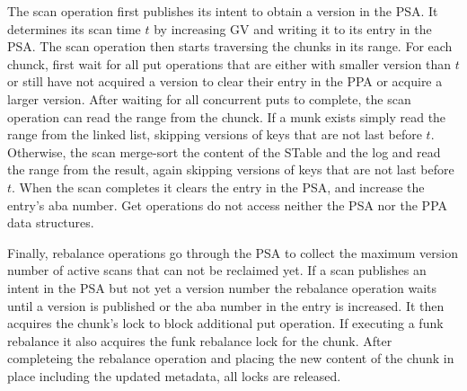 The scan operation first publishes its intent to obtain a version in the PSA. It determines its scan time $t$ by increasing GV and writing it to its entry in the PSA. The scan operation then starts traversing the chunks in its range. For each chunck, first wait for all put operations that are either with smaller version than $t$ or still have not acquired a version to clear their entry in the PPA or acquire a larger version. After waiting for all concurrent puts to complete, the scan operation can read the range from the chunck. If a munk exists simply read the range from the linked list, skipping versions of keys that are not last before $t$. Otherwise, the scan merge-sort the content of the STable and the log and read the range from the result, again skipping versions of keys that are not last before $t$. When the scan completes it clears the entry in the PSA, and increase the entry's aba number. Get operations do not access neither the PSA nor the PPA data structures.

Finally, rebalance operations go through the PSA to collect the maximum version number of active scans that can not be reclaimed yet. If a scan publishes an intent in the PSA but not yet a version number the rebalance operation waits until a version is published or the aba number in the entry is increased. It then acquires the chunk's lock to block additional put operation. If executing a funk rebalance it also acquires the funk rebalance lock for the chunk. After completeing the rebalance operation and placing the new content of the chunk in place including the updated metadata, all locks are released.


